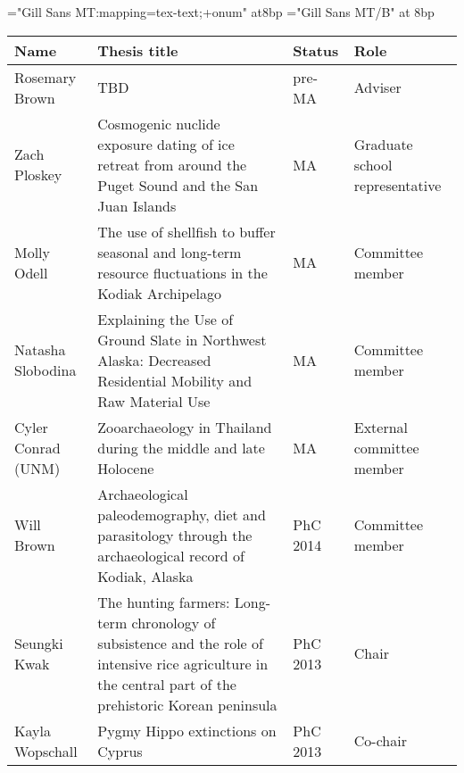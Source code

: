 \documentclass[11pt,article,oneside,oldfontcommands]{memoir}
\begin{document}
\begin{Spacing}{0.7}

\def\mainfont{Gill Sans MT}
\font\bodyfont="\mainfont:mapping=tex-text;+onum" at8bp \let\tenrm\bodyfont
\font\boldfont="\mainfont/B" at 8bp \let\tenbf\boldfont
\bodyfont

\begin{center}
\def\arraystretch{1}%
    \begin{longtable}{ l L{6cm} p{2cm}  p{2cm} }
     Name   & Thesis title  & Status     & Role    \\ 
   \midrule
     \endhead 


    Rosemary Brown          & TBD                                                                                                                                                          & pre-MA             & Adviser                        \\
    Zach Ploskey            & Cosmogenic nuclide exposure dating of ice retreat from around the Puget Sound and the San Juan Islands                                                       & MA                 & Graduate school representative \\
    Molly Odell             & The use of shellfish to buffer seasonal and long-term resource fluctuations in the Kodiak Archipelago                                                        & MA                 & Committee member               \\
    Natasha Slobodina       & Explaining the Use of Ground Slate in Northwest Alaska: Decreased Residential Mobility and Raw Material Use                                                  & MA                 & Committee member               \\
    Cyler Conrad (UNM)      & Zooarchaeology in Thailand during the middle and late Holocene   & MA                 & External committee member      \\
    Will Brown              & Archaeological paleodemography, diet and parasitology through the  archaeological record of Kodiak, Alaska                                                   & PhC 2014           & Committee member               \\
    Seungki Kwak            & The hunting farmers: Long-term chronology of subsistence and the role of intensive rice agriculture in the central part of the  prehistoric Korean peninsula & PhC 2013           & Chair                          \\
    Kayla Wopschall         & Pygmy Hippo extinctions on Cyprus                                                                                                                            & PhC 2013           & Co-chair                       \\

\end{longtable}
\end{center}
\end{Spacing}
\end{document}
